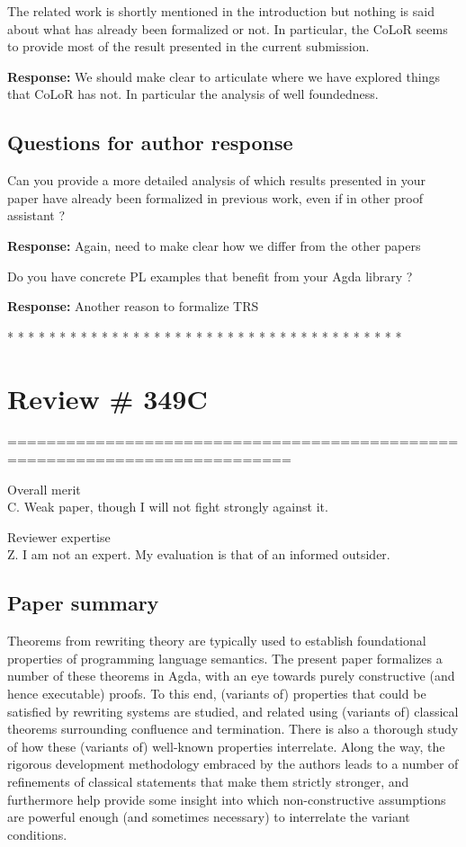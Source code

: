 \documentclass[11pt]{article}
\newcommand{\res}[1]{\par\noindent\textbf{Response:} #1\par}
\begin{document}
The related work is shortly mentioned in the introduction but nothing is said about what has already been formalized or not.
In particular, the CoLoR seems to provide most of the result presented in the current submission.
\res{We should make clear to articulate where we have explored things that CoLoR has not. In particular the analysis of well foundedness.}
\subsection*{Questions for author response}

Can you provide a more detailed analysis of which results presented in your paper have already been formalized
in previous work, even if in other proof assistant ?
\res{Again, need to make clear how we differ from the other papers}
Do you have concrete PL examples that benefit from your Agda library ?
\res{Another reason to formalize TRS}

* * * * * * * * * * * * * * * * * * * * * * * * * * * * * * * * * * * * * *

\section*{Review \# 349C}
===========================================================================

Overall merit
\\
C. Weak paper, though I will not fight strongly against it.

Reviewer expertise
\\
Z. I am not an expert. My evaluation is that of an informed outsider.

\subsection*{Paper summary}

Theorems from rewriting theory are typically used to establish foundational
properties of programming language semantics. The present paper formalizes a
number of these theorems in Agda, with an eye towards purely constructive (and
hence executable) proofs. To this end, (variants of) properties that could
be satisfied by rewriting systems are studied, and related using (variants of)
classical theorems surrounding confluence and termination. There is also a
thorough study of how these (variants of) well-known properties interrelate.
Along the way, the rigorous development methodology embraced by the authors
leads to a number of refinements of classical statements that make them
strictly stronger, and furthermore help provide some insight into which
non-constructive assumptions are powerful enough (and sometimes necessary) to
interrelate the variant conditions.
\end{document}
